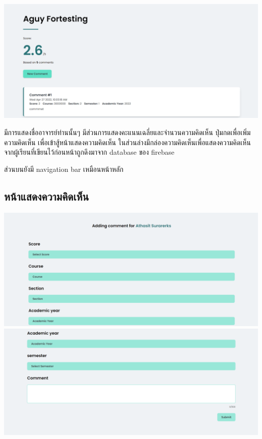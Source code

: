 \documentclass[17pt]{extarticle}
\begin{document}
\begin{center}
    \includegraphics[scale=0.4]{professor_page.png}
\end{center}
\par มีการแสดงชื่ออาจารย์ท่านนั้นๆ มีส่วนการแสดงคะแนนเฉลี่ยและจำนวนความคิดเห็น ปุ่มกดเพื่อเพิ่มความคิดเห็น เพื่อเข้าสู้หน้าแสดงความคิดเห็น ในส่วนล่างมีกล่องความคิดเห็นเพื่อแสดงความคิดเห็นจากผู้เรียนที่เขียนไว้ก่อนหน้าถูกดึงมาจาก database ของ firebase
\par ส่วนบนยังมี navigation bar เหมือนหน้าหลัก
\pagebreak
\subsection{หน้าแสดงความคิดเห็น}
\begin{center}
    \includegraphics[scale=0.4]{add_comment.png}\\
    \includegraphics[scale=0.4]{add_comment2.png}
\end{center}
\end{document}
